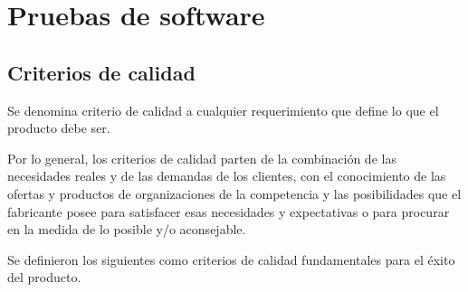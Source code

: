 \section{Pruebas de software}

\subsection{Criterios de calidad}
Se denomina criterio de calidad a cualquier requerimiento que define lo que el
producto debe ser.

Por lo general, los criterios de calidad parten de la combinación de las
necesidades reales y de las demandas de los clientes, con el conocimiento de las
ofertas y productos de organizaciones de la competencia y las posibilidades que
el fabricante posee para satisfacer esas necesidades y expectativas o para
procurar en la medida de lo posible y/o aconsejable\cite{Haaz}.

Se definieron los siguientes como criterios de calidad fundamentales para el
éxito del producto\cite{Fillottrani}.

